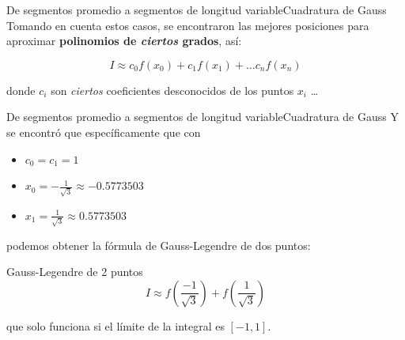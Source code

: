 \documentclass[spanish, c, dvipsnames]{beamer}
\begin{document}
\begin{frame}{De segmentos promedio a segmentos de longitud variable}{Cuadratura de Gauss}
    Tomando en cuenta estos casos, se encontraron las \alert{mejores posiciones} para aproximar \textbf{polinomios de \textit{ciertos} grados}, así:
    
    \bigskip
    
    $$I \approx c_0 f(x_0) + c_1 f(x_1) + \dots c_n f(x_n)$$

    donde $c_i$ son \textit{ciertos} coeficientes desconocidos de los puntos $x_i$ \dots

\end{frame}

\begin{frame}{De segmentos promedio a segmentos de longitud variable}{Cuadratura de Gauss}
Y se encontró que específicamente que con

\begin{itemize}
    \item $c_0 = c_1 = 1$
    \item $x_0 = - \frac{1}{\sqrt{3}} \approx -0.5773503$
    \item $x_1 = \frac{1}{\sqrt{3}} \approx 0.5773503$
\end{itemize}

podemos obtener la fórmula de \alert{Gauss-Legendre} de dos puntos:

\begin{block}{Gauss-Legendre de 2 puntos}
    \begin{equation}
        \label{eq:gausslegendre2p}
        I \approx f\left(\frac{-1}{\sqrt{3}}\right) + f\left(\frac{1}{\sqrt{3}}\right)
    \end{equation}
\end{block}

que \alert{solo funciona si el límite de la integral es $[-1, 1]$}.

\end{frame}
\end{document}
